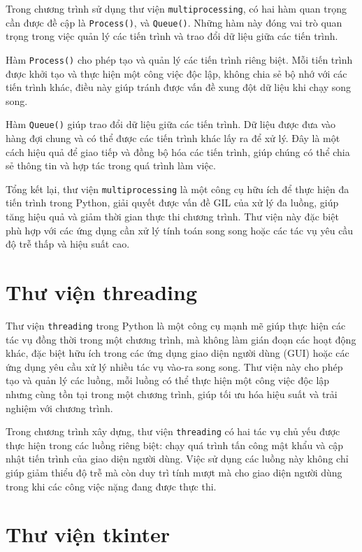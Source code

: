 \documentclass[../DoAn.tex]{subfiles}
\begin{document}
Trong chương trình sử dụng thư viện \verb|multiprocessing|, có hai hàm quan trọng cần được đề cập là \verb|Process()|, và \verb|Queue()|. Những hàm này đóng vai trò quan trọng trong việc quản lý các tiến trình và trao đổi dữ liệu giữa các tiến trình.

Hàm \verb|Process()| cho phép tạo và quản lý các tiến trình riêng biệt. Mỗi tiến trình được khởi tạo và thực hiện một công việc độc lập, không chia sẻ bộ nhớ với các tiến trình khác, điều này giúp tránh được vấn đề xung đột dữ liệu khi chạy song song.

Hàm \verb|Queue()| giúp trao đổi dữ liệu giữa các tiến trình. Dữ liệu được đưa vào hàng đợi chung và có thể được các tiến trình khác lấy ra để xử lý. Đây là một cách hiệu quả để giao tiếp và đồng bộ hóa các tiến trình, giúp chúng có thể chia sẻ thông tin và hợp tác trong quá trình làm việc.

Tổng kết lại, thư viện \verb|multiprocessing| là một công cụ hữu ích để thực hiện đa tiến trình trong Python, giải quyết được vấn đề GIL của xử lý đa luồng, giúp tăng hiệu quả và giảm thời gian thực thi chương trình. Thư viện này đặc biệt phù hợp với các ứng dụng cần xử lý tính toán song song hoặc các tác vụ yêu cầu độ trễ thấp và hiệu suất cao.

\section{Thư viện threading}
\label{section:3.3}

Thư viện \verb|threading| trong Python là một công cụ mạnh mẽ giúp thực hiện các tác vụ đồng thời trong một chương trình, mà không làm gián đoạn các hoạt động khác, đặc biệt hữu ích trong các ứng dụng giao diện người dùng (GUI) hoặc các ứng dụng yêu cầu xử lý nhiều tác vụ vào-ra song song. Thư viện này cho phép tạo và quản lý các luồng, mỗi luồng có thể thực hiện một công việc độc lập nhưng cùng tồn tại trong một chương trình, giúp tối ưu hóa hiệu suất và trải nghiệm với chương trình.

Trong chương trình xây dựng, thư viện \verb|threading| có hai tác vụ chủ yếu được thực hiện trong các luồng riêng biệt: chạy quá trình tấn công mật khẩu và cập nhật tiến trình của giao diện người dùng. Việc sử dụng các luồng này không chỉ giúp giảm thiểu độ trễ mà còn duy trì tính mượt mà cho giao diện người dùng trong khi các công việc nặng đang được thực thi.

\section{Thư viện tkinter} 
\label{section:3.4}
\end{document}

